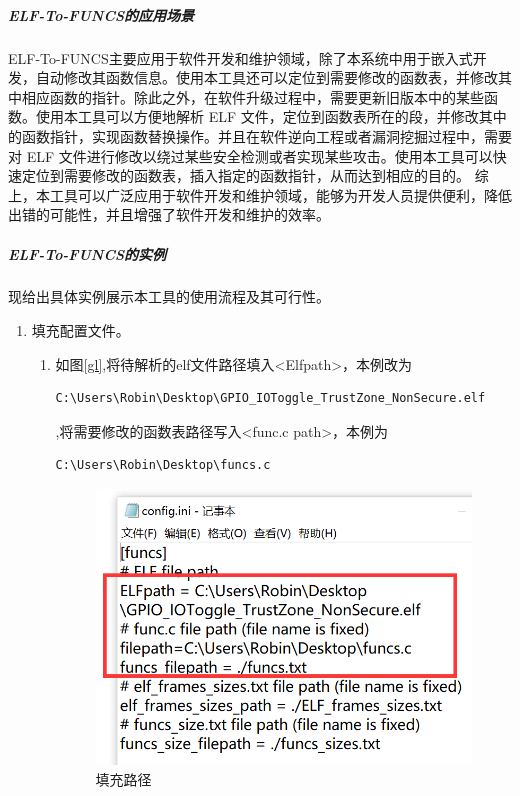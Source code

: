 \documentclass[12pt,a4paper]{ctexart}
\numberwithin{figure}{section}
\begin{document}
\subparagraph{ELF-To-FUNCS的应用场景}
\par ELF-To-FUNCS主要应用于软件开发和维护领域，除了本系统中用于嵌入式开发，自动修改其函数信息。使用本工具还可以定位到需要修改的函数表，并修改其中相应函数的指针。除此之外，在软件升级过程中，需要更新旧版本中的某些函数。使用本工具可以方便地解析 ELF 文件，定位到函数表所在的段，并修改其中的函数指针，实现函数替换操作。并且在软件逆向工程或者漏洞挖掘过程中，需要对 ELF 文件进行修改以绕过某些安全检测或者实现某些攻击。使用本工具可以快速定位到需要修改的函数表，插入指定的函数指针，从而达到相应的目的。
综上，本工具可以广泛应用于软件开发和维护领域，能够为开发人员提供便利，降低出错的可能性，并且增强了软件开发和维护的效率。
\subparagraph{ELF-To-FUNCS的实例}
\par 现给出具体实例展示本工具的使用流程及其可行性。
\begin{enumerate}
    \item 填充配置文件。
          \begin{enumerate}
              \item 如图\ref{gl},将待解析的elf文件路径填入<Elfpath>，本例改为\begin{verbatim}C:\Users\Robin\Desktop\GPIO_IOToggle_TrustZone_NonSecure.elf\end{verbatim},将需要修改的函数表路径写入<func.c path>，本例为\begin{verbatim}C:\Users\Robin\Desktop\funcs.c\end{verbatim}
                    \begin{figure}
                        \centering
                        \includegraphics[scale=0.4]{graph/gailujing.png}
                        \caption{填充路径}

\end{figure}
\end{enumerate}
\end{enumerate}
\end{document}
